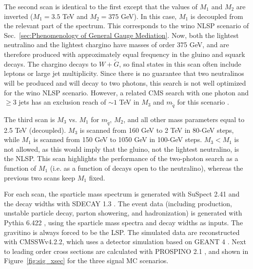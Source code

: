 \documentclass[dissertation.tex]{subfiles}
\begin{document}
The second scan is identical to the first except that the values of $M_{1}$ and $M_{2}$ are inverted ($M_{1} = 3.5$ TeV and $M_{2} = 375$ GeV).  In this case, $M_{1}$ is decoupled from the relevant part of the spectrum.  This corresponds to the wino NLSP scenario of Sec.~\ref{sec:Phenomenology of General Gauge Mediation}.  Now, both the lightest neutralino and the lightest chargino have masses of order 375 GeV, and are therefore produced with approximately equal frequency in the gluino and squark decays.  The chargino decays to $W+\tilde{G}$, so final states in this scan often include leptons or large jet multiplicity.  Since there is no guarantee that two neutralinos will be produced and will decay to two photons, this search is not well optimized for the wino NLSP scenario.  However, a related CMS search with one photon and $\geq3$ jets has an exclusion reach of $\sim1$ TeV in $M_{3}$ and $m_{\tilde{q}}$ for this scenario \cite{CMS_GMSB_5fb-1}.

The third scan is $M_{3}$ vs. $M_{1}$ for $m_{\tilde{q}}$, $M_{2}$, and all other mass parameters equal to 2.5 TeV (decoupled).  $M_{3}$ is scanned from 160 GeV to 2 TeV in 80-GeV steps, while $M_{1}$ is scanned from 150 GeV to 1050 GeV in 100-GeV steps.  $M_{3} < M_{1}$ is not allowed, as this would imply that the gluino, not the lightest neutralino, is the NLSP.  This scan highlights the performance of the two-photon search as a function of $M_{1}$ (i.e. as a function of decays open to the neutralino), whereas the previous two scans keep $M_{1}$ fixed.

For each scan, the sparticle mass spectrum is generated with SuSpect 2.41 \cite{SuSpect} and the decay widths with SDECAY 1.3 \cite{SDECAY}.  The event data (including production, unstable particle decay, parton showering, and hadronization) is generated with Pythia 6.422 \cite{Pythia6}, using the sparticle mass spectra and decay widths as inputs.  The gravitino is always forced to be the LSP.  The simulated data are reconstructed with CMSSWv4.2.2, which uses a detector simulation based on GEANT 4 \cite{GEANT}.  Next to leading order cross sections are calculated with PROSPINO 2.1 \cite{PROSPINO}, and shown in Figure~\ref{fig:sig_xsec} for the three signal MC scenarios.
\end{document}

